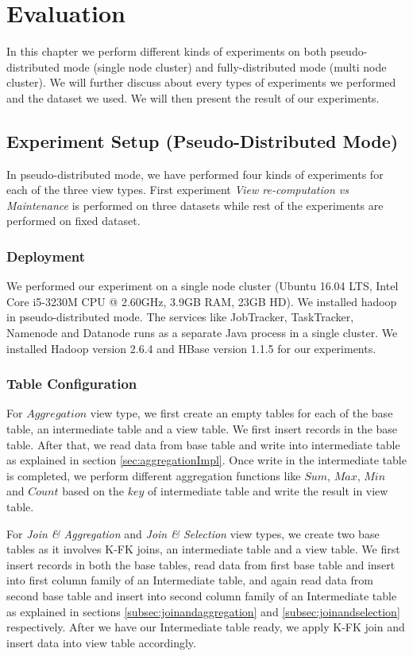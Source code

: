 \documentclass[11pt,a4paper,bibtotoc,idxtotoc,headsepline,footsepline,footexclude,BCOR12mm,DIV13]{scrbook}
\begin{document}
\newpage
\chapter{Evaluation}
\label{Evaluation}
In this chapter we perform different kinds of experiments on both pseudo-distributed mode (single node cluster) and fully-distributed mode (multi node cluster). We will further discuss about every types of experiments we performed and the dataset we used. We will then present the result of our experiments.

\section{Experiment Setup (Pseudo-Distributed Mode)}
In pseudo-distributed mode, we have performed four kinds of experiments for each of the three view types. First experiment \emph{View re-computation vs Maintenance} is performed on three datasets while rest of the experiments are performed on fixed dataset.

\subsection{Deployment}
We performed our experiment on a single node cluster (Ubuntu 16.04 LTS, Intel Core i5-3230M CPU @ 2.60GHz, 3.9GB RAM, 23GB HD). We installed hadoop in pseudo-distributed mode. The services like JobTracker, TaskTracker, Namenode and Datanode runs as a separate Java process in a single cluster. We installed Hadoop version 2.6.4 and HBase version 1.1.5 for our experiments.

\subsection{Table Configuration}
\label{Table Configuration standalone}
For $Aggregation$ view type, we first create an empty tables for each of the base table, an intermediate table and a view table. We first insert records in the base table. After that, we read data from base table and write into intermediate table as explained in section \ref{sec:aggregationImpl}. Once write in the intermediate table is completed, we perform different aggregation functions like $Sum$, $Max$, $Min$ and $Count$ based on the $key$ of intermediate table and write the result in view table.


For \emph{Join \& Aggregation} and \emph{Join \& Selection} view types, we create two base tables as it involves K-FK joins, an intermediate table and a view table. We first insert records in both the base tables, read data from first base table and insert into first column family of an Intermediate table, and again read data from second base table and insert into second column family of an Intermediate table as explained in sections \ref{subsec:joinandaggregation} and \ref{subsec:joinandselection} respectively. After we have our Intermediate table ready, we apply K-FK join and insert data into view table accordingly.
\end{document}
